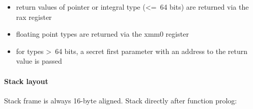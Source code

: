 \begin{itemize}
\item return values of pointer or integral type (\textless=\ 64 bits) are returned via the rax register
\item floating point types are returned via the xmm0 register
\item for types \textgreater\ 64 bits, a secret first parameter with an address to the return value is passed
\end{itemize}


\paragraph{Stack layout}

Stack frame is always 16-byte aligned.
Stack directly after function prolog:\\

